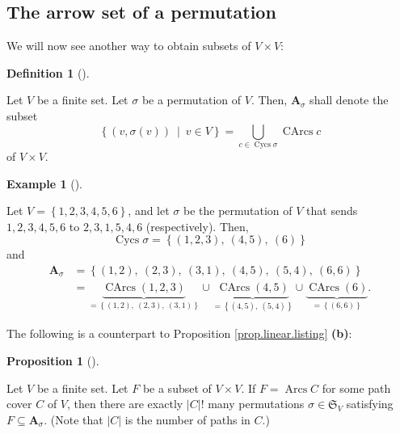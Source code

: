 \documentclass[numbers=enddot,12pt,final,onecolumn,notitlepage]{scrartcl}%
\numberwithin{exer}{section}
\theoremstyle{definition}
\newtheorem{prop}[theo]{Proposition}
\newenvironment{proposition}[1][]
{\begin{prop}[#1]\begin{leftbar}}
{\end{leftbar}\end{prop}}
\newtheorem{defi}[theo]{Definition}
\newenvironment{definition}[1][]
{\begin{defi}[#1]\begin{leftbar}}
{\end{leftbar}\end{defi}}
\newtheorem{exam}[theo]{Example}
\newenvironment{example}[1][]
{\begin{exam}[#1]\begin{leftbar}}
{\end{leftbar}\end{exam}}
\let\cupnonlimits\bigcup
\renewcommand{\bigcup}{\cupnonlimits\limits}
\begin{document}
\subsection{The arrow set of a permutation}

We will now see another way to obtain subsets of $V\times V$:

\begin{definition}
\label{def.Asigma}Let $V$ be a finite set. Let $\sigma$ be a permutation of
$V$. Then, $\mathbf{A}_{\sigma}$ shall denote the subset%
\[
\left\{  \left(  v,\sigma\left(  v\right)  \right)  \ \mid\ v\in V\right\}
=\bigcup_{c\in\operatorname*{Cycs}\sigma}\operatorname*{CArcs}c
\]
of $V\times V$.
\end{definition}

\begin{example}
Let $V=\left\{  1,2,3,4,5,6\right\}  $, and let $\sigma$ be the permutation of
$V$ that sends $1,2,3,4,5,6$ to $2,3,1,5,4,6$ (respectively). Then,
\[
\operatorname*{Cycs}\sigma=\left\{  \left(  1,2,3\right)  ,\ \left(
4,5\right)  ,\ \left(  6\right)  \right\}
\]
and%
\begin{align*}
\mathbf{A}_{\sigma}  &  =\left\{  \left(  1,2\right)  ,\ \left(  2,3\right)
,\ \left(  3,1\right)  ,\ \left(  4,5\right)  ,\ \left(  5,4\right)
,\ \left(  6,6\right)  \right\} \\
&  =\underbrace{\operatorname*{CArcs}\left(  1,2,3\right)  }_{=\left\{
\left(  1,2\right)  ,\ \left(  2,3\right)  ,\ \left(  3,1\right)  \right\}
}\cup\underbrace{\operatorname*{CArcs}\left(  4,5\right)  }_{=\left\{  \left(
4,5\right)  ,\ \left(  5,4\right)  \right\}  }\cup
\underbrace{\operatorname*{CArcs}\left(  6\right)  }_{=\left\{  \left(
6,6\right)  \right\}  }.
\end{align*}

\end{example}

The following is a counterpart to Proposition \ref{prop.linear.listing}
\textbf{(b)}:

\begin{proposition}
\label{prop.linear.Aisg-num}Let $V$ be a finite set. Let $F$ be a subset of
$V\times V$. If $F=\operatorname*{Arcs}C$ for some path cover $C$ of $V$, then
there are exactly $\left\vert C\right\vert !$ many permutations $\sigma
\in\mathfrak{S}_{V}$ satisfying $F\subseteq\mathbf{A}_{\sigma}$. (Note that
$\left\vert C\right\vert $ is the number of paths in $C$.)
\end{proposition}
\end{document}
